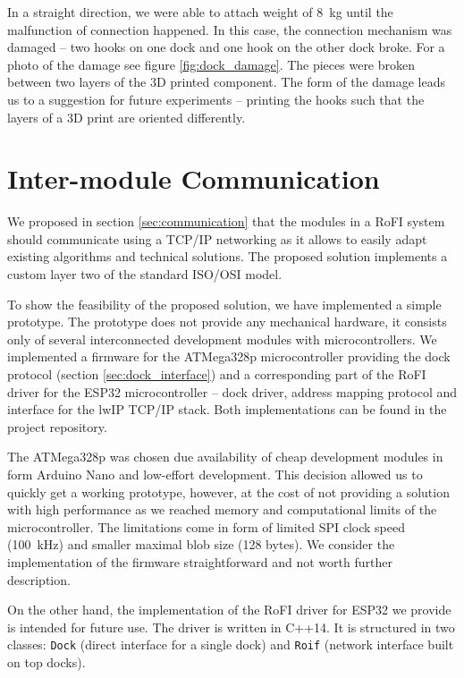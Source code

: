 In a straight direction, we were able to attach weight of 8~kg until the
malfunction of connection happened. In this case, the connection mechanism was
damaged -- two hooks on one dock and one hook on the other dock broke. For a
photo of the damage see figure \ref{fig:dock_damage}. The pieces were broken
between two layers of the 3D printed component. The form of the damage leads us
to a suggestion for future experiments -- printing the hooks such that the
layers of a 3D print are oriented differently.


\section{Inter-module Communication}

We proposed in section \ref{sec:communication} that the modules in a RoFI system
should communicate using a TCP/IP networking as it allows to easily adapt
existing algorithms and technical solutions. The proposed solution implements a
custom layer two of the standard ISO/OSI model.

To show the feasibility of the proposed solution, we have implemented a simple
prototype. The prototype does not provide any mechanical hardware, it consists
only of several interconnected development modules with microcontrollers. We
implemented a firmware for the ATMega328p microcontroller providing the dock
protocol (section \ref{sec:dock_interface}) and a corresponding part of the RoFI
driver for the ESP32 microcontroller -- dock driver, address mapping protocol
and interface for the lwIP TCP/IP stack. Both implementations can be found in the
project repository.

The ATMega328p was chosen due availability of cheap development modules in form
Arduino Nano and low-effort development. This decision allowed us to quickly get
a working prototype, however, at the cost of not providing a solution with high
performance as we reached memory and computational limits of the
microcontroller. The limitations come in form of limited SPI clock speed
(100~kHz) and smaller maximal blob size (128 bytes). We consider the
implementation of the firmware straightforward and not worth further
description.

On the other hand, the implementation of the RoFI driver for ESP32 we provide is
intended for future use. The driver is written in C++14. It is structured in two
classes: \texttt{Dock} (direct interface for a single dock) and \texttt{Roif}
(network interface built on top docks).

